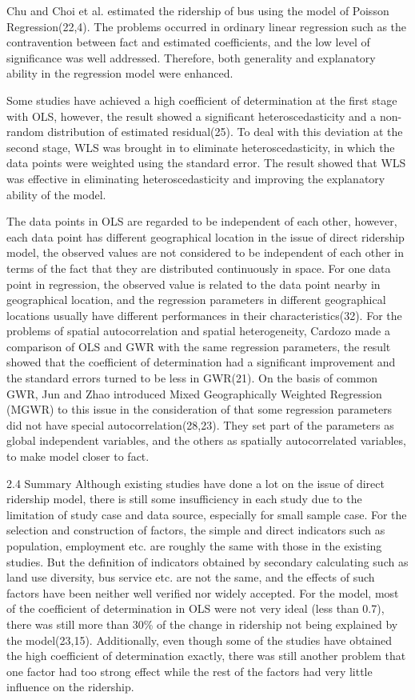 Chu and Choi et al. estimated the ridership of bus using the model of Poisson Regression(22,4). The problems occurred in ordinary linear regression such as the contravention between fact and estimated coefficients, and the low level of significance was well addressed. Therefore, both generality and explanatory ability in the regression model were enhanced.

Some studies have achieved a high coefficient of determination at the first stage with OLS, however, the result showed a significant heteroscedasticity and a non-random distribution of estimated residual(25). To deal with this deviation at the second stage, WLS was brought in to eliminate heteroscedasticity, in which the data points were weighted using the standard error. The result showed that WLS was effective in eliminating heteroscedasticity and improving the explanatory ability of the model.

The data points in OLS are regarded to be independent of each other, however, each data point has different geographical location in the issue of direct ridership model, the observed values are not considered to be independent of each other in terms of the fact that they are distributed continuously in space. For one data point in regression, the observed value is related to the data point nearby in geographical location, and the regression parameters in different geographical locations usually have different performances in their characteristics(32). For the problems of spatial autocorrelation and spatial heterogeneity, Cardozo made a comparison of OLS and GWR with the same regression parameters, the result showed that the coefficient of determination had a significant improvement and the standard errors turned to be less in GWR(21). On the basis of common GWR, Jun and Zhao introduced Mixed Geographically Weighted Regression (MGWR) to this issue in the consideration of that some regression parameters did not have special autocorrelation(28,23). They set part of the parameters as global independent variables, and the others as spatially autocorrelated variables, to make model closer to fact.

2.4 Summary
Although existing studies have done a lot on the issue of direct ridership model, there is still some insufficiency in each study due to the limitation of study case and data source, especially for small sample case. For the selection and construction of factors, the simple and direct indicators such as population, employment etc. are roughly the same with those in the existing studies. But the definition of indicators obtained by secondary calculating such as land use diversity, bus service etc. are not the same, and the effects of such factors have been neither well verified nor widely accepted. For the model, most of the coefficient of determination in OLS were not very ideal (less than 0.7), there was still more than 30\% of the change in ridership not being explained by the model(23,15). Additionally, even though some of the studies have obtained the high coefficient of determination exactly, there was still another problem that one factor had too strong effect while the rest of the factors had very little influence on the ridership.

